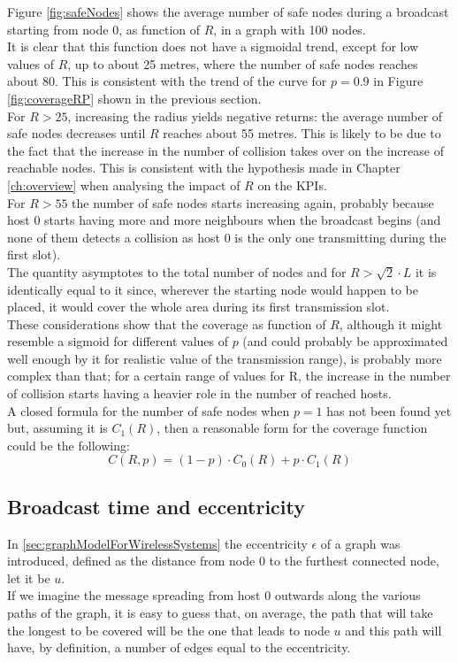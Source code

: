 \hfill \break
Figure \ref{fig:safeNodes} shows the average number of safe nodes during a broadcast starting from node 0, as function of $R$, in a graph with 100 nodes.\\
It is clear that this function does not have a sigmoidal trend, except for low values of $R$, up to about 25 metres, where the number of safe nodes reaches about 80. This is consistent with the trend of the curve for $p=0.9$ in Figure \ref{fig:coverageRP} shown in the previous section.\\
For $R > 25$, increasing the radius yields negative returns: the average number of safe nodes decreases until $R$ reaches about 55 metres. This is likely to be due to the fact that the increase in the number of collision takes over on the increase of reachable nodes. This is consistent with the hypothesis made in Chapter \ref{ch:overview} when analysing the impact of $R$ on the KPIs.\\
For $R > 55$ the number of safe nodes starts increasing again, probably because host 0 starts having more and more neighbours when the broadcast begins (and none of them detects a collision as host 0 is the only one transmitting during the first slot).\\ The quantity asymptotes to the total number of nodes and for $R > \sqrt{2}{\cdot}L$ it is identically equal to it since, wherever the starting node would happen to be placed, it would cover the whole area during its first transmission slot.\\
\hfill \break
These considerations show that the coverage as function of $R$, although it might resemble a sigmoid for different values of $p$ (and could probably be approximated well enough by it for realistic value of the transmission range), is probably more complex than that; for a certain range of values for R, the increase in the number of collision starts having a heavier role in the number of reached hosts.\\
A closed formula for the number of safe nodes when $p=1$ has not been found yet but, assuming it is $C_{1}(R)$, then a reasonable form for the coverage function could be the following:
\begin{equation}\label{eq:coverageClosedForm}
C(R, p) = (1-p)\cdot C_{0}(R) + p\cdot C_{1}(R)
\end{equation}

\subsection{Broadcast time and eccentricity}\label{ssec:durationVsEccentricity}
In \ref{sec:graphModelForWirelessSystems} the eccentricity $\epsilon$ of a graph was introduced, defined as the distance from node 0 to the furthest connected node, let it be $u$.\\
If we imagine the message spreading from host 0 outwards along the various paths of the graph, it is easy to guess that, on average, the path that will take the longest to be covered will be the one that leads to node $u$ and this path will have, by definition, a number of edges equal to the eccentricity.\\


